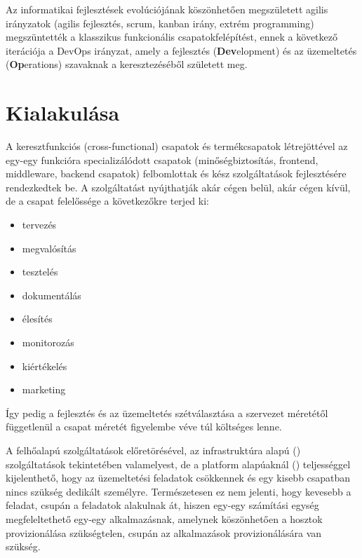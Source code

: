 
Az informatikai fejlesztések evolúciójának köszönhetően megszületett agilis irányzatok (agilis fejlesztés, scrum, kanban irány, extrém programming) megszüntették a klasszikus funkcionális csapatokfelépítést, ennek a következő iterációja a DevOps irányzat, amely a fejlesztés (\textbf{Dev}elopment) és az üzemeltetés (\textbf{Op}erations) szavaknak a keresztezéséből született meg.

\section{Kialakulása}

A keresztfunkciós (cross-functional) csapatok és termékcsapatok létrejöttével az egy-egy funkcióra specializálódott csapatok (minőségbiztosítás, frontend, middleware, backend csapatok) felbomlottak és kész szolgáltatások fejlesztésére rendezkedtek be. A szolgáltatást nyújthatják akár cégen belül, akár cégen kívül, de a csapat felelőssége a következőkre terjed ki:
\begin{itemize}
  \item tervezés
  \item megvalósítás
  \item tesztelés
  \item dokumentálás
  \item élesítés
  \item monitorozás
  \item kiértékelés
  \item marketing
\end{itemize}
Így pedig a fejlesztés és az üzemeltetés szétválasztása a szervezet méretétől függetlenül a csapat méretét figyelembe véve túl költséges lenne.

A felhőalapú szolgáltatások előretörésével, az infrastruktúra alapú () szolgáltatások tekintetében valamelyest, de a platform alapúaknál () teljességgel kijelenthető, hogy az üzemeltetési feladatok csökkennek és egy kisebb csapatban nincs szükség dedikált személyre. Természetesen ez nem jelenti, hogy kevesebb a feladat, csupán a feladatok alakulnak át, hiszen egy-egy számítási egység megfeleltethető egy-egy alkalmazásnak, amelynek köszönhetően a hosztok provizionálása szükségtelen, csupán az alkalmazások provizionálására van szükség.

